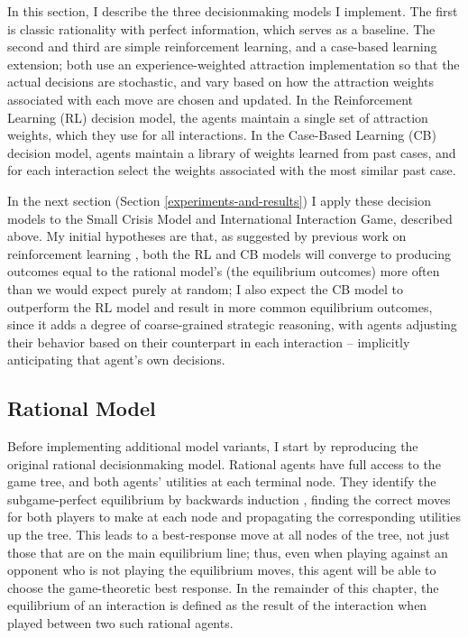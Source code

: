 In this section, I describe the three decisionmaking models I implement. The first is classic rationality with perfect information, which serves as a baseline. The second and third are simple reinforcement learning, and a case-based learning extension; both use an experience-weighted attraction implementation so that the actual decisions are stochastic, and vary based on how the attraction weights associated with each move are chosen and updated. In the Reinforcement Learning (RL) decision model, the agents maintain a single set of attraction weights, which they use for all interactions. In the Case-Based Learning (CB) decision model, agents maintain a library of weights learned from past cases, and for each interaction select the weights associated with the most similar past case.

In the next section (Section \ref{experiments-and-results}) I apply these decision models to the Small Crisis Model and International Interaction Game, described above. My initial hypotheses are that, as suggested by previous work on reinforcement learning \citep[e.g.][]{laslier_2005,akramizadeh_2009,galla_2013}, both the RL and CB models will converge to producing outcomes equal to the rational model's (the equilibrium outcomes) more often than we would expect purely at random; I also expect the CB model to outperform the RL model and result in more common equilibrium outcomes, since it adds a degree of coarse-grained strategic reasoning, with agents adjusting their behavior based on their counterpart in each interaction -- implicitly anticipating that agent's own decisions.

\subsection{Rational Model}\label{original-spe-model}

Before implementing additional model variants, I start by reproducing the original rational decisionmaking model. Rational agents have full access to the game tree, and both agents' utilities at each terminal node. They identify the subgame-perfect equilibrium by backwards induction \citep{russell_2009}, finding the correct moves for both players to make at each node and propagating the corresponding utilities up the tree. This leads to a best-response move at all nodes of the tree, not just those that are on the main equilibrium line; thus, even when playing against an opponent who is not playing the equilibrium moves, this agent will be able to choose the game-theoretic best response. In the remainder of this chapter, the equilibrium of an interaction is defined as the result of the interaction when played between two such rational agents.

